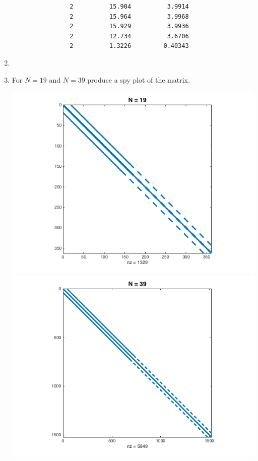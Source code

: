 \documentclass[11pt, oneside, titlepage]{article}
\begin{document}
\begin{enumerate}
\begin{verbatim}
                2          15.904          3.9914
                2          15.964          3.9968
                2          15.929          3.9936
                2          12.734          3.6706
                2          1.3226         0.40343
        \end{verbatim}

    \item %

        

    \item %
        For $N = 19$ and $N = 39$ produce a spy plot of the matrix.
        \begin{center}
            \includegraphics[scale=.5]{Figures/03_5_1.png}
            \includegraphics[scale=.5]{Figures/03_5_2.png}
        \end{center}


\end{enumerate}
\end{document}
